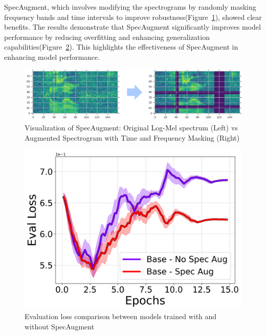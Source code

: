 \documentclass[10pt,twocolumn,letterpaper]{article}
\begin{document}
SpecAugment, which involves modifying the spectrograms by randomly masking frequency bands and time intervals to improve robustness(Figure~\ref{fig:spec-augment})\cite{SpecAugment}, showed clear benefits. The results demonstrate that SpecAugment significantly improves model performance by reducing overfitting and enhancing generalization capabilities(Figure~\ref{fig:spec_aug_comparison}). This highlights the effectiveness of SpecAugment in enhancing model performance.

\begin{figure}
    \centering
    \includegraphics[width=1.0\linewidth]{./spec_augment.png}
    \caption{Visualization of SpecAugment: Original Log-Mel spectrum (Left) vs Augmented Spectrogram with Time and Frequency Masking (Right)}
    \label{fig:spec-augment}
\end{figure}

\begin{figure}[t]
    \centering
    \includegraphics[width=0.8\linewidth]{./base_spec_eval/eval_loss_line.png}
    \caption{Evaluation loss comparison between models trained with and without SpecAugment}
    \label{fig:spec_aug_comparison}
\end{figure}

        
\end{document}
